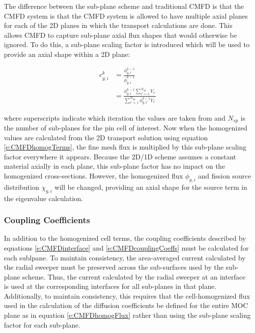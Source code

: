 The difference between the sub-plane scheme and traditional CMFD is that the CMFD system is that the CMFD system is allowed to have multiple axial planes for each of the 2D planes in which the transport calculations are done.  This allows CMFD to capture sub-plane axial flux shapes that would otherwise be ignored.  To do this, a sub-plane scaling factor is introduced which will be used to provide an axial shape within a 2D plane:

\begin{align}
c_{g,i}^k &= \frac{\phi_{g,i}^{k-1}}{\overline{\phi}_{g,i}^{k-1}} \nonumber\\
 &= \frac{\phi_{g,i}^{k-1} \sum_{i'=1}^{N_{sp}} V_{i'}}{\sum_{i'=1}^{N_{sp}} \phi_{g,i'}^{k-1} V_{i'}}
\end{align}

where superscripts indicate which iteration the values are taken from and $N_{sp}$ is the number of sub-planes for the pin cell of interest.  Now when the homogenized values are calculated from the 2D transport solution using equation \ref{e:CMFDhomogTerms}, the fine mesh flux is multiplied by this sub-plane scaling factor everywhere it appears.  Because the 2D/1D scheme assumes a constant material axially in each plane, this sub-plane factor has no impact on the homogenized cross-sections.  However, the homogenized flux $\phi_{g,i}$ and fission source distribution $\chi_{g,i}$ will be changed, providing an axial shape for the source term in the eigenvalue calculation.

\subsubsection{Coupling Coefficients}

In addition to the homogenized cell terms, the coupling coefficients described by equations \ref{e:CMFDinterface} and \ref{e:CMFDcouplingCoeffs} must be calculated for each sublpane.  To maintain consistency, the area-averaged current calculated by the radial sweeper must be preserved across the sub-surfaces used by the sub-plane scheme.  Thus, the current calculated by the radial sweeper at an interface is used at the corresponding interfaces for all sub-planes in that plane.  Additionally, to maintain consistency, this requires that the cell-homogenized flux used in the calculation of the diffusion coefficients be defined for the entire MOC plane as in equation \ref{e:CMFDhomogFlux} rather than using the sub-plane scaling factor for each sub-plane.

